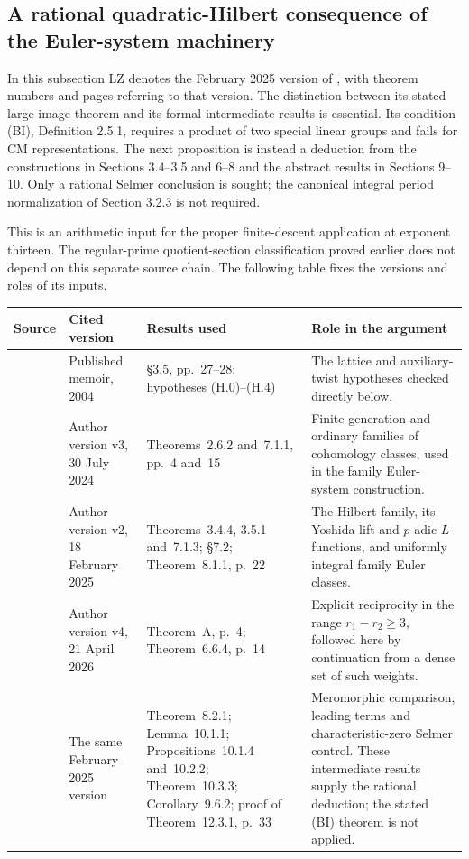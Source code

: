 \subsection{A rational quadratic-Hilbert consequence of the Euler-system machinery}
\label{subsec:lm-lz-rational}

In this subsection LZ denotes the February 2025 version of
\citet{LoefflerZerbes2025}, with theorem numbers and pages referring
to that version.  The distinction between its
stated large-image theorem and its formal intermediate results is
essential.  Its condition (BI), Definition 2.5.1, requires a product of
two special linear groups and fails for CM representations.  The next
proposition is instead a deduction from the constructions in Sections
3.4--3.5 and 6--8 and the abstract results in Sections 9--10.  Only a
rational Selmer conclusion is sought; the canonical integral period
normalization of Section 3.2.3 is not required.

This is an arithmetic input for the proper finite-descent application
at exponent thirteen. The regular-prime quotient-section classification
proved earlier does not depend on this separate source chain.
The following table fixes the versions and roles of its inputs.

\begin{center}
\begingroup
\small
\setlength{\tabcolsep}{3pt}
\renewcommand{\arraystretch}{1.12}
\begin{tabular}{@{}p{.17\linewidth}p{.17\linewidth}p{.30\linewidth}p{.30\linewidth}@{}}
\toprule
Source & Cited version & Results used & Role in the argument \\
\midrule
\citet{MazurRubin2004}
& Published memoir, 2004
& \S3.5, pp.~27--28: hypotheses (H.0)--(H.4)
& The lattice and auxiliary-twist hypotheses checked directly below. \\
\addlinespace
\citet{LoefflerRockwoodZerbes2024}
& Author version v3, 30 July 2024
& Theorems~2.6.2 and~7.1.1, pp.~4 and~15
& Finite generation and ordinary families of cohomology classes, used in the family Euler-system construction. \\
\addlinespace
\citet{LoefflerZerbes2025}
& Author version v2, 18 February 2025
& Theorems~3.4.4, 3.5.1 and~7.1.3; \S7.2; Theorem~8.1.1, p.~22
& The Hilbert family, its Yoshida lift and $p$-adic $L$-functions, and uniformly integral family Euler classes. \\
\addlinespace
\citet{LoefflerZerbes2026}
& Author version v4, 21 April 2026
& Theorem~A, p.~4; Theorem~6.6.4, p.~14
& Explicit reciprocity in the range $r_1-r_2\ge3$, followed here by continuation from a dense set of such weights. \\
\addlinespace
\citet{LoefflerZerbes2025}
& The same February 2025 version
& Theorem~8.2.1; Lemma~10.1.1; Propositions~10.1.4 and~10.2.2; Theorem~10.3.3; Corollary~9.6.2; proof of Theorem~12.3.1, p.~33
& Meromorphic comparison, leading terms and characteristic-zero Selmer control. These intermediate results supply the rational deduction; the stated (BI) theorem is not applied. \\
\bottomrule
\end{tabular}
\endgroup
\end{center}

